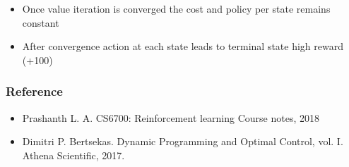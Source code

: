 \documentclass[11pt]{article}
\providecommand{\tightlist}{%
      \setlength{\itemsep}{0pt}\setlength{\parskip}{0pt}}
\begin{document}
\begin{itemize}
\tightlist
\item
  Once value iteration is converged the cost and policy per state
  remains constant
\item
  After convergence action at each state leads to terminal state high
  reward (+100)
\end{itemize}

\subsubsection{Reference}\label{reference}

\begin{itemize}
\tightlist
\item
  Prashanth L. A. CS6700: Reinforcement learning Course notes, 2018
\item
  Dimitri P. Bertsekas. Dynamic Programming and Optimal Control, vol. I.
  Athena Scientific, 2017.
\end{itemize}


    
    
    
    
\end{document}
